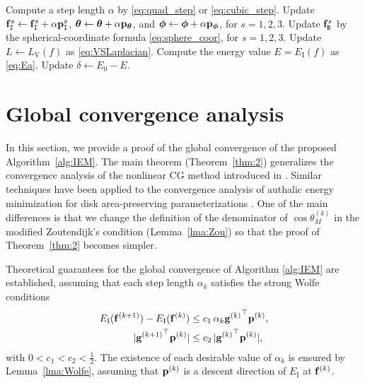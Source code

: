 \documentclass[11pt,a4paper]{article}
\begin{document}
\begin{algorithm}
\begin{algorithmic}[1]
    \EndIf
    \State Compute a step length $\alpha$ by \eqref{eq:quad_step} or \eqref{eq:cubic_step}.
    \State Update $\mathbf{f}_{\mathtt{I}}^s \leftarrow \mathbf{f}_{\mathtt{I}}^s + \alpha \mathbf{p}_{\mathtt{I}}^s$, ${\boldsymbol{\theta}} \leftarrow {\boldsymbol{\theta}} + \alpha \mathbf{p}_{\boldsymbol{\theta}}$, and ${\boldsymbol{\phi}} \leftarrow {\boldsymbol{\phi}} + \alpha \mathbf{p}_{\boldsymbol{\phi}}$, for $s=1,2,3$.
    \State Update $\mathbf{f}_{\mathtt{B}}^s$ by the spherical-coordinate formula \eqref{eq:sphere_coor}, for $s=1,2,3$.
    \State Update $L\gets L_\mathrm{V}(f)$ as \eqref{eq:VSLaplacian}.
    \State Compute the energy value $E = E_\mathrm{I}(f)$ as \eqref{eq:Ea}.
    \State Update $\delta \leftarrow E_0 - E$.
\EndWhile
\end{algorithmic}
\end{algorithm}






\section{Global convergence analysis}
\label{sec:5}
In this section, we provide a proof of the global convergence of the proposed Algorithm~\ref{alg:IEM}. The main theorem (Theorem~\ref{thm:2}) generalizes the convergence analysis of the nonlinear CG method introduced in \cite[Chapter 5]{NoWr06}. Similar techniques have been applied to the convergence analysis of authalic energy minimization for disk area-preserving parameterizations \cite{LiYu24}. One of the main differences is that we change the definition of the denominator of $\cos\theta_M^{(k)}$ in the modified Zoutendijk's condition (Lemma~\ref{lma:Zou}) so that the proof of Theorem~\ref{thm:2} becomes simpler. 


Theoretical guarantees for the global convergence of Algorithm \ref{alg:IEM} are established, assuming that each step length $\alpha_k$ satisfies the strong Wolfe conditions 
\begin{subequations} \label{eq:Wolfe}
\begin{align}
E_{\mathrm{I}}(\mathbf{f}^{(k+1)}) - E_{\mathrm{I}}(\mathbf{f}^{(k)})& \leq  c_1 \, \alpha_k {\mathbf{g}^{(k)}}^{\top} \mathbf{p}^{(k)}, \label{eq:Wolfe1} \\
|{\mathbf{g}^{(k+1)}}^{\top}  \mathbf{p}^{(k)}| & \leq c_2 \, | {\mathbf{g}^{(k)}}^{\top} \mathbf{p}^{(k)}|, \label{eq:Wolfe2}
\end{align}
\end{subequations}
with $0 < c_1 < c_2 < \frac{1}{2}$. 
The existence of each desirable value of $\alpha_k$ is ensured by Lemma~\ref{lma:Wolfe}, assuming that $\mathbf{p}^{(k)}$ is a descent direction of $E_\mathrm{I}$ at $\mathbf{f}^{(k)}$.
\end{document}
